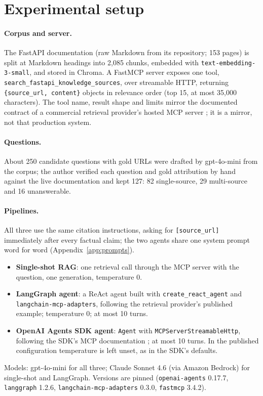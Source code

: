 \documentclass[11pt]{article}
\newcommand{\code}[1]{\texttt{#1}}
\begin{document}
\section{Experimental setup}
\label{sec:setup}

\paragraph{Corpus and server.} The FastAPI documentation (raw Markdown from its repository; 153
pages) is split at Markdown headings into 2,085 chunks, embedded with
\code{text-embedding-3-small}, and stored in Chroma. A FastMCP server exposes one tool,
\code{search\_fastapi\_knowledge\_sources}, over streamable HTTP, returning
\code{\{source\_url, content\}} objects in relevance order (top 15, at most 35,000 characters). The
tool name, result shape and limits mirror the documented contract of a commercial retrieval
provider's hosted MCP server \citep{kapa2025mcp}; it is a mirror, not that production system.

\paragraph{Questions.} About 250 candidate questions with gold URLs were drafted by gpt-4o-mini from
the corpus; the author verified each question and gold attribution by hand against the live
documentation and kept 127: 82 single-source, 29 multi-source and 16 unanswerable.

\paragraph{Pipelines.} All three use the same citation instructions, asking for
\code{[source\_url]} immediately after every factual claim; the two agents share one system prompt
word for word (Appendix~\ref{app:prompts}).
\begin{itemize}
\item \textbf{Single-shot RAG}: one retrieval call through the MCP server with the question, one
generation, temperature 0.
\item \textbf{LangGraph agent}: a ReAct agent \citep{yao2023react} built with
\code{create\_react\_agent} and \code{langchain-mcp-adapters}, following the retrieval provider's
published example; temperature 0; at most 10 turns.
\item \textbf{OpenAI Agents SDK agent}: \code{Agent} with \code{MCPServerStreamableHttp}, following
the SDK's MCP documentation \citep{openai2025agentssdk}; at most 10 turns. In the published
configuration temperature is left unset, as in the SDK's defaults.
\end{itemize}
Models: gpt-4o-mini for all three; Claude Sonnet 4.6 (via Amazon Bedrock) for single-shot and
LangGraph. Versions are pinned (\code{openai-agents} 0.17.7, \code{langgraph} 1.2.6,
\code{langchain-mcp-adapters} 0.3.0, \code{fastmcp} 3.4.2).
\end{document}
